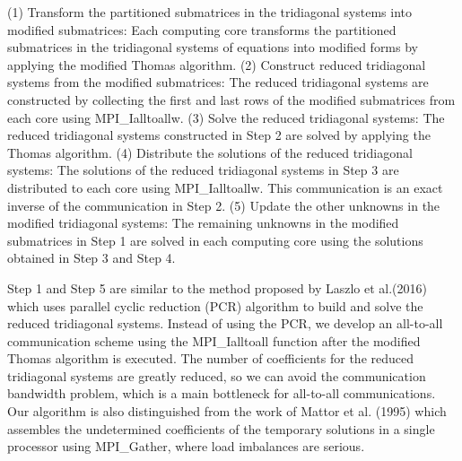 (1) Transform the partitioned submatrices in the tridiagonal systems into modified submatrices\+: Each computing core transforms the partitioned submatrices in the tridiagonal systems of equations into modified forms by applying the modified Thomas algorithm. (2) Construct reduced tridiagonal systems from the modified submatrices\+: The reduced tridiagonal systems are constructed by collecting the first and last rows of the modified submatrices from each core using M\+P\+I\+\_\+\+Ialltoallw. (3) Solve the reduced tridiagonal systems\+: The reduced tridiagonal systems constructed in Step 2 are solved by applying the Thomas algorithm. (4) Distribute the solutions of the reduced tridiagonal systems\+: The solutions of the reduced tridiagonal systems in Step 3 are distributed to each core using M\+P\+I\+\_\+\+Ialltoallw. This communication is an exact inverse of the communication in Step 2. (5) Update the other unknowns in the modified tridiagonal systems\+: The remaining unknowns in the modified submatrices in Step 1 are solved in each computing core using the solutions obtained in Step 3 and Step 4.

Step 1 and Step 5 are similar to the method proposed by Laszlo et al.(2016) which uses parallel cyclic reduction (P\+CR) algorithm to build and solve the reduced tridiagonal systems. Instead of using the P\+CR, we develop an all-\/to-\/all communication scheme using the M\+P\+I\+\_\+\+Ialltoall function after the modified Thomas algorithm is executed. The number of coefficients for the reduced tridiagonal systems are greatly reduced, so we can avoid the communication bandwidth problem, which is a main bottleneck for all-\/to-\/all communications. Our algorithm is also distinguished from the work of Mattor et al. (1995) which assembles the undetermined coefficients of the temporary solutions in a single processor using M\+P\+I\+\_\+\+Gather, where load imbalances are serious.

